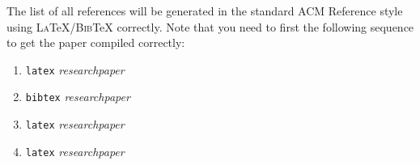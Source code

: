 \documentclass[sigconf, anonymous]{acmart}
\def\BibTeX{\textsc{Bib}\TeX}
\def\LaTeX{\textsc{La}\TeX}
\begin{document}
The list of all references will be generated in the standard ACM Reference
style using \LaTeX{}/\BibTeX{} correctly. Note that you
need to first the following sequence to get the paper
compiled correctly:

\begin{enumerate}
\item {\tt latex} {\em researchpaper}
\item {\tt bibtex} {\em researchpaper}
\item {\tt latex} {\em researchpaper}
\item {\tt latex} {\em researchpaper}
\end{enumerate}



\balance

 
\end{document}
